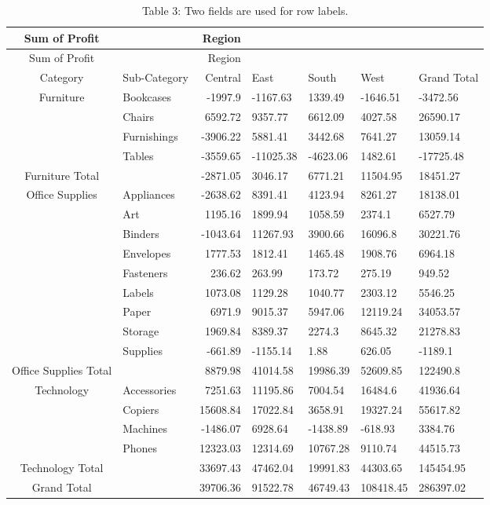 \documentclass[
]{article}
\theoremstyle{definition}
\theoremstyle{definition}
\theoremstyle{definition}
\theoremstyle{definition}
\theoremstyle{remark}
\begin{document}
\hypertarget{Table3}{}
\begin{longtable}[]{@{}clrllll@{}}
\caption{Table 3: Two fields are used for row labels.}\tabularnewline
\toprule
Sum of Profit & & Region & & & & \\
\midrule
\endfirsthead
\toprule
Sum of Profit & & Region & & & & \\
\midrule
\endhead
Category & Sub-Category & Central & East & South & West & Grand Total \\
Furniture & Bookcases & -1997.9 & -1167.63 & 1339.49 & -1646.51 & -3472.56 \\
& Chairs & 6592.72 & 9357.77 & 6612.09 & 4027.58 & 26590.17 \\
& Furnishings & -3906.22 & 5881.41 & 3442.68 & 7641.27 & 13059.14 \\
& Tables & -3559.65 & -11025.38 & -4623.06 & 1482.61 & -17725.48 \\
Furniture Total & & -2871.05 & 3046.17 & 6771.21 & 11504.95 & 18451.27 \\
Office Supplies & Appliances & -2638.62 & 8391.41 & 4123.94 & 8261.27 & 18138.01 \\
& Art & 1195.16 & 1899.94 & 1058.59 & 2374.1 & 6527.79 \\
& Binders & -1043.64 & 11267.93 & 3900.66 & 16096.8 & 30221.76 \\
& Envelopes & 1777.53 & 1812.41 & 1465.48 & 1908.76 & 6964.18 \\
& Fasteners & 236.62 & 263.99 & 173.72 & 275.19 & 949.52 \\
& Labels & 1073.08 & 1129.28 & 1040.77 & 2303.12 & 5546.25 \\
& Paper & 6971.9 & 9015.37 & 5947.06 & 12119.24 & 34053.57 \\
& Storage & 1969.84 & 8389.37 & 2274.3 & 8645.32 & 21278.83 \\
& Supplies & -661.89 & -1155.14 & 1.88 & 626.05 & -1189.1 \\
Office Supplies Total & & 8879.98 & 41014.58 & 19986.39 & 52609.85 & 122490.8 \\
Technology & Accessories & 7251.63 & 11195.86 & 7004.54 & 16484.6 & 41936.64 \\
& Copiers & 15608.84 & 17022.84 & 3658.91 & 19327.24 & 55617.82 \\
& Machines & -1486.07 & 6928.64 & -1438.89 & -618.93 & 3384.76 \\
& Phones & 12323.03 & 12314.69 & 10767.28 & 9110.74 & 44515.73 \\
Technology Total & & 33697.43 & 47462.04 & 19991.83 & 44303.65 & 145454.95 \\
Grand Total & & 39706.36 & 91522.78 & 46749.43 & 108418.45 & 286397.02 \\
\bottomrule
\end{longtable}
\end{document}
